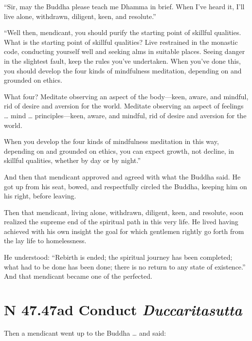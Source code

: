 \documentclass[12pt,openany]{book}%
\newcommand*{\suttatitleacronym}[1]{\smaller[2]{#1}\vspace*{.3em}}
\newcommand*{\suttatitletranslation}[1]{\linebreak{#1}}
\newcommand*{\suttatitleroot}[1]{\linebreak\smaller[2]\itshape{#1}}
\newcommand*{\tocacronym}[1]{\hspace*{-3.3em}{#1}\quad}
\newcommand*{\toctranslation}[1]{#1}
\newcommand*{\tocroot}[1]{(\textit{#1})}
\begin{document}
“Sir, may the Buddha please teach me Dhamma in brief. When I’ve heard it, I’ll live alone, withdrawn, diligent, keen, and resolute.” 

“Well then, mendicant, you should purify the starting point of skillful qualities. What is the starting point of skillful qualities? Live restrained in the monastic code, conducting yourself well and seeking alms in suitable places. Seeing danger in the slightest fault, keep the rules you’ve undertaken. When you’ve done this, you should develop the four kinds of mindfulness meditation, depending on and grounded on ethics. 

What four? Meditate observing an aspect of the body—keen, aware, and mindful, rid of desire and aversion for the world. Meditate observing an aspect of feelings … mind … principles—keen, aware, and mindful, rid of desire and aversion for the world. 

When you develop the four kinds of mindfulness meditation in this way, depending on and grounded on ethics, you can expect growth, not decline, in skillful qualities, whether by day or by night.” 

And then that mendicant approved and agreed with what the Buddha said. He got up from his seat, bowed, and respectfully circled the Buddha, keeping him on his right, before leaving. 

Then that mendicant, living alone, withdrawn, diligent, keen, and resolute, soon realized the supreme end of the spiritual path in this very life. He lived having achieved with his own insight the goal for which gentlemen rightly go forth from the lay life to homelessness. 

He understood: “Rebirth is ended; the spiritual journey has been completed; what had to be done has been done; there is no return to any state of existence.” And that mendicant became one of the perfected. 

%
\section*{{\suttatitleacronym SN 47.47}{\suttatitletranslation Bad Conduct }{\suttatitleroot Duccaritasutta}}
\addcontentsline{toc}{section}{\tocacronym{SN 47.47} \toctranslation{Bad Conduct } \tocroot{Duccaritasutta}}

Then a mendicant went up to the Buddha … and said: 
\end{document}
